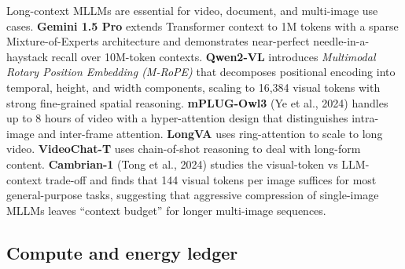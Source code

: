 Long-context MLLMs are essential for video, document, and multi-image use cases. \textbf{Gemini 1.5 Pro} extends Transformer context to 1M tokens with a sparse Mixture-of-Experts architecture and demonstrates near-perfect needle-in-a-haystack recall over 10M-token contexts. \textbf{Qwen2-VL} introduces \emph{Multimodal Rotary Position Embedding (M-RoPE)} that decomposes positional encoding into temporal, height, and width components, scaling to 16,384 visual tokens with strong fine-grained spatial reasoning. \textbf{mPLUG-Owl3} (Ye et al., 2024) handles up to 8 hours of video with a hyper-attention design that distinguishes intra-image and inter-frame attention. \textbf{LongVA} uses ring-attention to scale to long video. \textbf{VideoChat-T} uses chain-of-shot reasoning to deal with long-form content. \textbf{Cambrian-1} (Tong et al., 2024) studies the visual-token vs LLM-context trade-off and finds that 144 visual tokens per image suffices for most general-purpose tasks, suggesting that aggressive compression of single-image MLLMs leaves ``context budget'' for longer multi-image sequences.

\subsection{Compute and energy ledger}\label{compute-and-energy-ledger}

